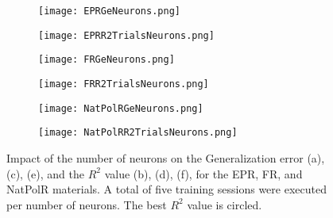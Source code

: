 \begin{figure}[htbp!]
	\centering
    \begin{subfigure}[b]{0.49\textwidth}
        \centering
        \texttt{[image: EPRGeNeurons.png]}
        \caption{}
        \label{fig:GenNeuronsEPR}
    \end{subfigure}
    \begin{subfigure}[b]{0.49\textwidth}
        \centering
        \texttt{[image: EPRR2TrialsNeurons.png]}
        \caption{}
        \label{fig:TrialsNeuronsEPR}
    \end{subfigure}
    \begin{subfigure}[b]{0.49\textwidth}
        \centering
        \texttt{[image: FRGeNeurons.png]}
        \caption{}
        \label{fig:GenNeuronsFR}
    \end{subfigure}
    \begin{subfigure}[b]{0.49\textwidth}
        \centering
        \texttt{[image: FRR2TrialsNeurons.png]}
        \caption{}
        \label{fig:TrialsNeuronsFR}
    \end{subfigure}
    \begin{subfigure}[b]{0.49\textwidth}
        \centering
        \texttt{[image: NatPolRGeNeurons.png]}
        \caption{}
        \label{fig:GenNeuronsNatPolR}
    \end{subfigure}
    \begin{subfigure}[b]{0.49\textwidth}
        \centering
        \texttt{[image: NatPolRR2TrialsNeurons.png]}
        \caption{}
        \label{fig:TrialsNeuronsNatPolR}
    \end{subfigure}
    \caption{Impact of the number of neurons on the Generalization error (a), (c), (e), and the $R^2$ value (b), (d), (f), for the EPR, FR, and NatPolR materials. A total of five training sessions were executed per number of neurons. The best $R^2$ value is circled.}
    \label{fig:TrialsNeurons1}
\end{figure}

